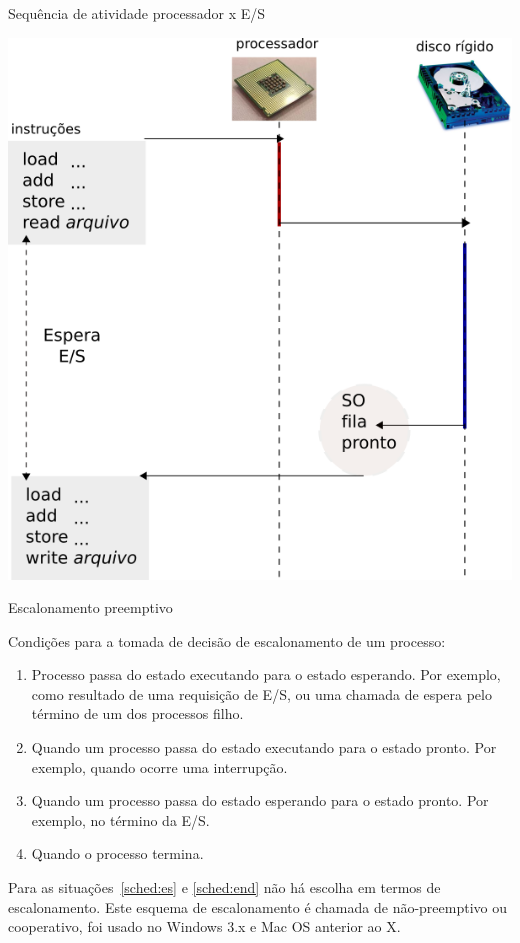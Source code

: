 \begin{frame}{Sequência de atividade processador x E/S}
\begin{center}
  \includegraphics[scale=0.4]{burst-cpu.png}
\end{center}
\end{frame}

\begin{frame}{Escalonamento preemptivo}

  Condições para a tomada de decisão de escalonamento de um processo:

  \begin{enumerate}
  \item<1-| alert@2> \label{sched:es} Processo passa do estado \alert{executando}
    para o estado \alert{esperando}. Por exemplo, como resultado de
    uma requisição de E/S, ou uma chamada de espera pelo término de um
    dos processos filho.
    \item \label{sched:irq}Quando um processo passa do
    estado \alert<1>{executando} para o estado \alert<1>{pronto}. Por
    exemplo, quando ocorre uma interrupção.
     \item \label{sched:endes} Quando um processo passa
    do estado \alert<1>{esperando} para o estado \alert<1>{pronto}. Por
    exemplo, no término da E/S.
    \item<1-| alert@2> \label{sched:end} Quando o processo \alert<1>{termina}.
  \end{enumerate}

{\small Para as situações~\ref{sched:es} e \ref{sched:end} não há
  escolha em termos de escalonamento. Este esquema de escalonamento é
  chamada de \alert{não-preemptivo} ou \alert{cooperativo}, foi usado
  no Windows 3.x e Mac OS anterior ao X.}

\end{frame}

